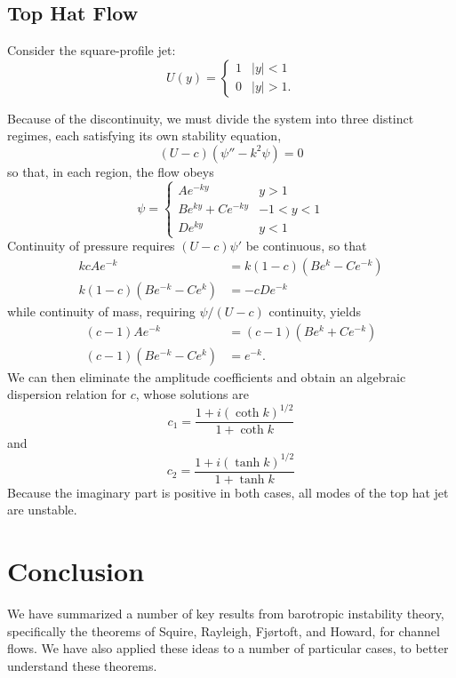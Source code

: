 \documentclass[letterpaper, 11pt, onecolumn]{article}
\begin{document}
\subsection{Top Hat Flow}
Consider the square-profile jet:
\begin{equation*}
U(y) = \begin{cases} 1 & \vert y \vert < 1 \\ 0 & \vert y \vert > 1. \end{cases}
\end{equation*}

Because of the discontinuity, we must divide the system into three distinct regimes, each satisfying its own stability equation,
\begin{equation*}
(U - c) (\psi'' - k^2 \psi) = 0
\end{equation*}
so that, in each region, the flow obeys
\begin{equation*}
\psi =
\begin{cases}
A e^{-ky} & y > 1 \\
B e^{ky} + C e^{-ky} & -1 < y < 1 \\
D e^{ky} & y < 1
\end{cases}
\end{equation*}
Continuity of pressure requires $(U - c)\psi'$ be continuous, so that
\begin{align*}
kc A e^{-k} &= k(1-c) \left(B e^{k} - C e^{-k}\right) \\
k(1-c) \left(B e^{-k} - C e^{k}\right) &= -cD e^{-k}
\end{align*}
while continuity of mass, requiring $\psi / (U - c)$ continuity, yields
\begin{align*}
(c-1) A e^{-k} &= (c-1) \left(B e^{k} + C e^{-k}\right) \\
(c-1) \left(B e^{-k} - C e^{k}\right) &=  e^{-k}.
\end{align*}
We can then eliminate the amplitude coefficients and obtain an algebraic dispersion relation for $c$, whose solutions are
\begin{equation*}
c_1 = \frac{1 + i (\coth k)^{1/2}}{1 + \coth k}
\end{equation*}
and
\begin{equation*}
c_2 = \frac{1 + i (\tanh k)^{1/2}}{1 + \tanh k}
\end{equation*}
Because the imaginary part is positive in both cases, all modes of the top hat jet are unstable.

\section{Conclusion}

We have summarized a number of key results from barotropic instability theory, specifically the theorems of Squire, Rayleigh, Fj\o rtoft, and Howard, for channel flows. We have also applied these ideas to a number of particular cases, to better understand these theorems.
\end{document}
